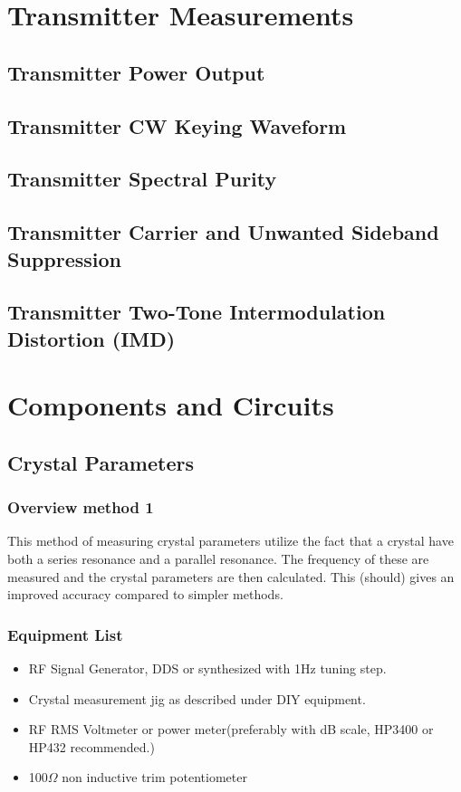 \documentclass[10pt,letterpaper]{book}
\begin{document}
\chapter{Transmitter Measurements}
%
\section{Transmitter Power Output}
\section{Transmitter CW Keying Waveform}

\section{Transmitter Spectral Purity}

\section{Transmitter Carrier and Unwanted Sideband Suppression}

\section{Transmitter Two-Tone Intermodulation Distortion (IMD)}


\chapter{Components and Circuits}

\newpage
\section{Crystal Parameters}

\subsection*{Overview method 1}
This method of measuring crystal parameters utilize the fact that a crystal have both a series resonance and a parallel resonance. The frequency of these are measured and the crystal parameters are then calculated. This (should) gives an improved accuracy compared to simpler methods. 
\subsection*{Equipment List}
\begin{itemize}
	\item RF Signal Generator, DDS or synthesized with 1Hz tuning step.
	\item Crystal measurement jig as described under DIY equipment.
	\item RF RMS Voltmeter or power meter(preferably with dB scale, HP3400 or HP432 recommended.) 
	\item 100$\Omega$ non inductive trim potentiometer
\end{itemize}
\end{document}
